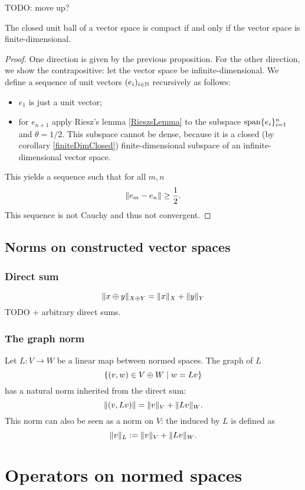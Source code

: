 TODO: move up?
\begin{proposition} \label{compactnessUnitBall}
The closed unit ball of a vector space is compact \textup{if and only if} the vector space is finite-dimensional.
\end{proposition}
\begin{proof}
One direction is given by the previous proposition. For the other direction, we show the contrapositive: let the vector space be infinite-dimensional.
We define a sequence of unit vectors $(e_i)_{i\in\mathbb{N}}$ recursively as follows:
\begin{itemize}
\item $e_1$ is just a unit vector;
\item for $e_{n+1}$ apply Riesz's lemma \ref{RieszsLemma} to the subspace $\operatorname{span}\{e_i\}_{i=1}^n$ and $\theta = 1/2$. This subspace cannot be dense, because it is a closed (by corollary \ref{finiteDimClosed}) finite-dimensional subspace of an infinite-dimensional vector space.
\end{itemize}
This yields a sequence such that for all $m,n$
\[ \lVert e_m - e_n\rVert\geq \frac{1}{2}. \]
This sequence is not Cauchy and thus not convergent.
\end{proof}







\subsection{Norms on constructed vector spaces}
\subsubsection{Direct sum}
\[ \lVert x\oplus y\rVert_{X\oplus Y} = \lVert x\rVert_X + \lVert y\rVert_Y \]
TODO + arbitrary direct sums.
\subsubsection{The graph norm}
Let $L:V\to W$ be a linear map between normed spaces. The graph of $L$
\[ \left\{ (v,w)\in V\oplus W \;\middle|\; w = Lv \right\} \]
has a natural norm inherited from the direct sum:
\[ \lVert(v,Lv)\rVert = \lVert v\rVert_V + \lVert Lv\rVert_W. \]
This norm can also be seen as a norm on $V$: the  induced by $L$ is defined as
\[ \lVert v\rVert_L := \lVert v\rVert_V + \lVert Lv\rVert_W. \]


\section{Operators on normed spaces}



